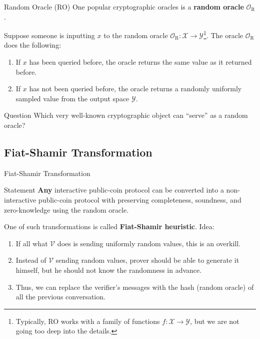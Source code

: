 \documentclass{zkdl-presentation-template}
\begin{document}
    \begin{frame}{Random Oracle (RO)}
        One popular cryptographic oracles is a \textbf{random oracle} $\mathcal{O}_{\text{R}}$. 

        \begin{definition}
            Suppose someone is inputting $x$ to the random oracle $\mathcal{O}_{\text{R}}: \mathcal{X} \to \mathcal{Y}$\footnote{Typically, RO works with a family of functions $f: \mathcal{X} \to \mathcal{Y}$, but we are not going too deep into the details.}. The oracle $\mathcal{O}_{\text{R}}$ does the following:
            \begin{enumerate}
                \item If $x$ has been queried before, the oracle returns the same value as it returned before.
                \item If $x$ has not been queried before, the oracle returns a randomly uniformly sampled value from the output space $\mathcal{Y}$.
            \end{enumerate}
        \end{definition}

        \begin{alertblock}{Question}
            Which very well-known cryptographic object can ``serve'' as a random oracle?
        \end{alertblock}
    \end{frame}
    \subsection{Fiat-Shamir Transformation}
    \begin{frame}{Fiat-Shamir Transformation}
        \begin{block}{Statement}
            \textbf{Any} interactive public-coin protocol can be converted into a non-interactive public-coin protocol with preserving completeness, soundness, and zero-knowledge using the random oracle.
        \end{block}

        One of such transformations is called \textbf{Fiat-Shamir heuristic}. Idea:
        \begin{enumerate}
            \item If all what $\mathcal{V}$ does is sending uniformly random values, this is an overkill.
            \item Instead of $\mathcal{V}$ sending random values, prover should be able to generate it himself, but he should not know the randomness in advance.
            \item Thus, we can replace the verifier's messages with the hash (random oracle) of all the previous conversation.
        \end{enumerate}
    \end{frame}
\end{document}
